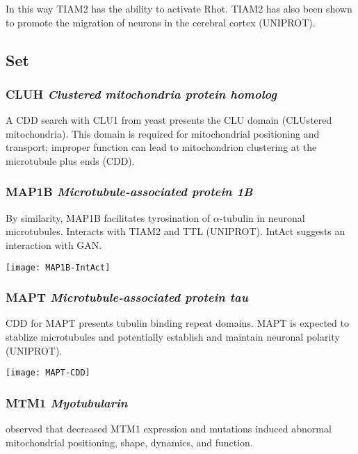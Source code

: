 In this way TIAM2 has the ability to activate Rhot. TIAM2 has also been shown to
promote the migration of neurons in the cerebral cortex (UNIPROT).

\subsection{Set}

\subsubsection{CLUH \textit{Clustered mitochondria protein homolog}}

A CDD search with CLU1 from yeast presents the CLU domain (CLUstered
mitochondria). This domain is required for mitochondrial positioning and
transport; improper function can lead to mitochondrion clustering at the
microtubule plus ends (CDD).

\subsubsection{MAP1B \textit{Microtubule-associated protein 1B}}

By similarity, MAP1B facilitates tyrosination of $\alpha$-tubulin in
neuronal microtubules. Interacts with TIAM2 and TTL (UNIPROT). IntAct
suggests an interaction with GAN.

\begin{center}
  \texttt{[image: MAP1B-IntAct]}
\end{center}

\subsubsection{MAPT \textit{Microtubule-associated protein tau}}

CDD for MAPT presents tubulin binding repeat domains. MAPT is expected to
stablize microtubules and potentially establish and maintain neuronal polarity
(UNIPROT).

\begin{center}
  \texttt{[image: MAPT-CDD]}
\end{center}

\subsubsection{MTM1 \textit{Myotubularin}}

\cite{Hnia2011} observed that decreased MTM1 expression and mutations
induced abnormal mitochondrial positioning, shape, dynamics, and function.

